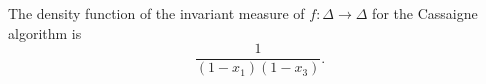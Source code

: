 The density function of the invariant measure of $f:\Delta\to\Delta$ for
the Cassaigne algorithm is
\cite{arnoux_symmetric_2015}
\[
\frac{1}{(1-x_1)(1-x_3)}.
\]
